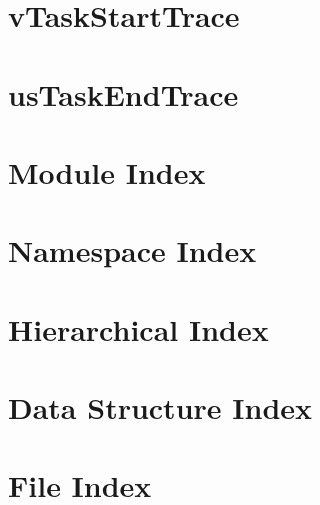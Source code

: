 \documentclass{book}
\begin{document}
\chapter{v\-Task\-Start\-Trace}
\label{vTaskStartTrace}
\hypertarget{vTaskStartTrace}{}

\chapter{us\-Task\-End\-Trace}
\label{usTaskEndTrace}
\hypertarget{usTaskEndTrace}{}

\chapter{Module Index}

\chapter{Namespace Index}

\chapter{Hierarchical Index}

\chapter{Data Structure Index}

\chapter{File Index}

\end{document}
